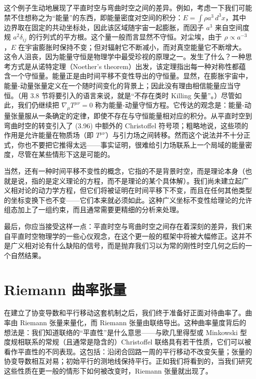 这个例子生动地展现了平直时空与弯曲时空之间的差异。例如，考虑一下我们可能禁不住想称之为“能量”的东西，即能量密度对空间的积分：$E = \int \rho a^3\, d^3x$，其中边界取在固定的共动坐标处，因此该区域随宇宙一起膨胀，而因子 $a^3$ 来自空间度规 $a^2\delta_{ij}$ 的行列式的平方根。这个量一般而言显然不守恒。对尘埃，由于 $\rho \propto a^{-3}$，$E$ 在宇宙膨胀时保持不变；但对辐射它不断减小，而对真空能量它不断增大。这令人沮丧，因为能量守恒是物理学中最受珍视的原理之一。发生了什么？一种思考方式是从诺特定理（Noether's theorem）出发，该定理指出每一种对称性都蕴含一个守恒量。能量正是由时间平移不变性导出的守恒量。显然，在膨胀宇宙中，能量-动量张量定义在一个随时间变化的背景上；因此没有理由相信能量应当守恒。（用 3.8 节将要引入的语言来说，就是“不存在类时 Killing 矢量”。）尽管如此，我们仍继续把 $\nabla_\mu T^{\mu\nu} = 0$ 称为能量-动量守恒方程。它传达的观念是：能量-动量张量服从一条确定的定律，即使不存在与守恒能量相对应的积分。从平直时空到弯曲时空的转变引入了 (3.96) 中额外的 Christoffel 符号项；粗略地说，这些项的作用是允许能量在物质场（即 $T^{\mu\nu}$）与引力场之间转移。然而这个说法并不十分正式，你也不要把它推得太远——事实证明，很难给引力场联系上一个局域的能量密度，尽管在某些情形下这是可能的。

当然，还有一种时间平移不变性的概念，它指的不是背景时空，而是理论本身（也就是说，指的是定义理论的方程，而不是理论的某个具体解）。我们尚未建立起广义相对论的动力学方程，但它们将被证明在时间平移下不变，而且在任何其他类型的坐标变换下也不变——它们本来就必须如此。这种广义坐标不变性给理论的允许组态加上了一组约束，而且通常需要更精细的分析来处理。

最后，你应当接受这样一点：平直时空与弯曲时空之间存在着深刻的差异，我们来自平直时空物理学的一些心仪观念，在这个更一般的框架中将被大幅修正。这并不是广义相对论有什么缺陷的信号，而是抛弃我们习以为常的刚性时空几何之后的一个自然结果。

\section{Riemann 曲率张量}

在建立了协变导数和平行移动这套机制之后，我们终于准备好正面对待曲率了。曲率由 Riemann 张量来量化，而 Riemann 张量由联络导出。这种曲率量度背后的想法是：我们知道联络的“平直性”是什么意思——与欧几里得型或 Minkowski 型度规相联系的常规（且通常是隐含的）Christoffel 联络具有若干性质，它们可以被看作平直性的不同表现。这包括：沿闭合回路一周的平行移动不改变矢量；张量的协变导数相互对易；初始平行的测地线保持平行。正如我们将看到的，当我们研究这些性质在更一般的情形下如何被改变时，Riemann 张量就出现了。

